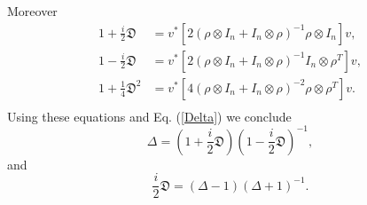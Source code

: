  Moreover
	\begin{equation}  
		\begin{split}
    1+\frac{i}{2}\mathfrak{D}&=v^\ast [ 2(\rho\otimes I_n+I_n\otimes \rho)^{-1}  \rho \otimes I_n]v,\\
    1-\frac{i}{2}\mathfrak{D}&=v^\ast [ 2(\rho\otimes I_n+I_n\otimes \rho)^{-1}I_n \otimes \rho^T]v,\\
    1+\frac{1}{4}\mathfrak{D}^2&=v^\ast[ 4(\rho\otimes I_n+I_n\otimes \rho)^{-2}\rho \otimes \rho^T]v.\\
    \end{split}
	\end{equation}
Using these equations and Eq. (\ref{Delta})  we conclude
		$$
    \Delta=\left(1+\frac{i}{2}\mathfrak{D}\right)\left(1-\frac{i}{2}\mathfrak{D}\right)^{-1},
		$$
		and
		$$
     \frac{i}{2}\mathfrak{D}=(\Delta-1)(\Delta+1)^{-1}.
		$$




